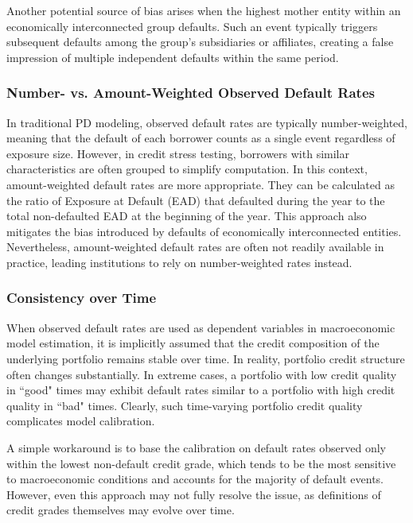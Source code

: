 \documentclass[11pt,a4paper]{article}
\begin{document}
Another potential source of bias arises when the highest mother entity within an economically interconnected group defaults. Such an event typically triggers subsequent defaults among the group's subsidiaries or affiliates, creating a false impression of multiple independent defaults within the same period.

\subsubsection{Number- vs. Amount-Weighted Observed Default Rates}

In traditional PD modeling, observed default rates are typically number-weighted, meaning that the default of each borrower counts as a single event regardless of exposure size. However, in credit stress testing, borrowers with similar characteristics are often grouped to simplify computation. In this context, amount-weighted default rates are more appropriate. They can be calculated as the ratio of Exposure at Default (EAD) that defaulted during the year to the total non-defaulted EAD at the beginning of the year. This approach also mitigates the bias introduced by defaults of economically interconnected entities. Nevertheless, amount-weighted default rates are often not readily available in practice, leading institutions to rely on number-weighted rates instead.

\subsubsection{Consistency over Time}

When observed default rates are used as dependent variables in macroeconomic model estimation, it is implicitly assumed that the credit composition of the underlying portfolio remains stable over time. In reality, portfolio credit structure often changes substantially. In extreme cases, a portfolio with low credit quality in ``good" times may exhibit default rates similar to a portfolio with high credit quality in ``bad" times. Clearly, such time-varying portfolio credit quality complicates model calibration.

A simple workaround is to base the calibration on default rates observed only within the lowest non-default credit grade, which tends to be the most sensitive to macroeconomic conditions and accounts for the majority of default events. However, even this approach may not fully resolve the issue, as definitions of credit grades themselves may evolve over time. 
\end{document}
